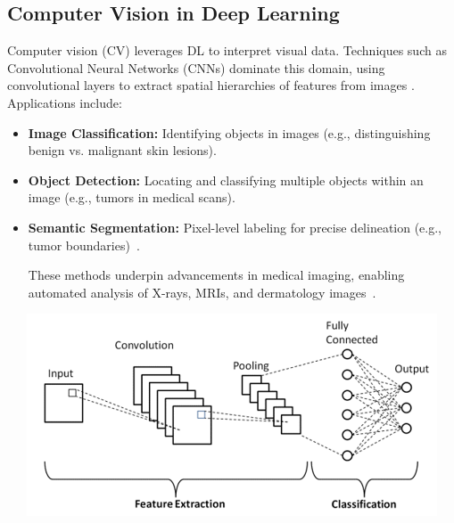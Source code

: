 \documentclass[a4paper,12pt]{report}
\begin{document}
\begin{spacing}{1.5}
    \section{Computer Vision in Deep Learning}
    Computer vision (CV) leverages DL to interpret visual data. Techniques such as Convolutional Neural Networks (CNNs) dominate this domain, using convolutional layers to extract spatial hierarchies of features from images \cite{dl3}. Applications include:
    \begin{itemize}
        \item \textbf{Image Classification:} Identifying objects in images (e.g., distinguishing benign vs. malignant skin lesions).
        \item \textbf{Object Detection:} Locating and classifying multiple objects within an image (e.g., tumors in medical scans).
        \item \textbf{Semantic Segmentation:} Pixel-level labeling for precise delineation (e.g., tumor boundaries)~\cite{dl4}.

    These methods underpin advancements in medical imaging, enabling automated analysis of X-rays, MRIs, and dermatology images~\cite{dl5}.
    \end{itemize}
    \hspace{3cm}
    \begin{center}
        \includegraphics[width=14cm, height=6cm]{Pics/cnn1.png}
    \end{center}
    \hspace{1cm}
    \begin{minipage}[rH]{0.1\textwidth}
        \cite{cnnImg}    
    \end{minipage}


\end{spacing}
\end{document}
